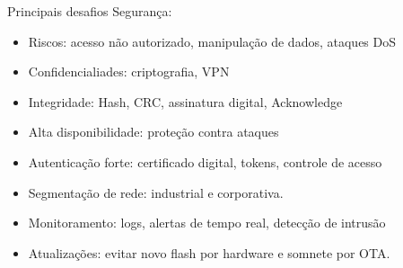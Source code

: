 \begin{frame}{Principais desafios}
    Segurança:
    \begin{itemize}
        \item Riscos: acesso não autorizado, manipulação de dados, ataques DoS
        \item Confidencialiades: criptografia, VPN
        \item Integridade: Hash, CRC, assinatura digital, Acknowledge
        \item Alta disponibilidade: proteção contra ataques
        \item Autenticação forte: certificado digital, tokens, controle de acesso
        \item Segmentação de rede: industrial e corporativa.
        \item Monitoramento: logs, alertas de tempo real, detecção de intrusão
        \item Atualizações: evitar novo flash por hardware e somnete por OTA.
    \end{itemize}
\end{frame}
